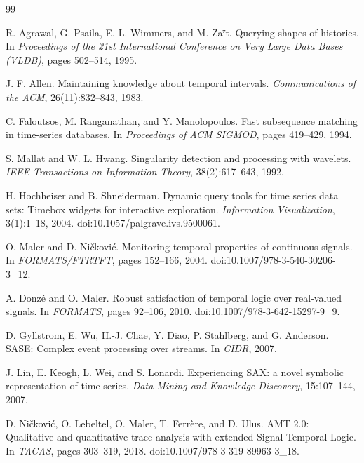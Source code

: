 \documentclass[11pt,a4paper]{article}
\begin{document}
\begin{thebibliography}{99}

R. Agrawal, G. Psaila, E. L. Wimmers, and M. Za\"it.
\newblock Querying shapes of histories.
\newblock In \emph{Proceedings of the 21st International Conference on Very Large Data Bases (VLDB)}, pages 502--514, 1995.

J. F. Allen.
\newblock Maintaining knowledge about temporal intervals.
\newblock \emph{Communications of the ACM}, 26(11):832--843, 1983.

C. Faloutsos, M. Ranganathan, and Y. Manolopoulos.
\newblock Fast subsequence matching in time-series databases.
\newblock In \emph{Proceedings of ACM SIGMOD}, pages 419--429, 1994.

S. Mallat and W. L. Hwang.
\newblock Singularity detection and processing with wavelets.
\newblock \emph{IEEE Transactions on Information Theory}, 38(2):617--643, 1992.

H. Hochheiser and B. Shneiderman.
\newblock Dynamic query tools for time series data sets: Timebox widgets for interactive exploration.
\newblock \emph{Information Visualization}, 3(1):1--18, 2004. doi:10.1057/palgrave.ivs.9500061.

O. Maler and D. Ni\v{c}kovi\'c.
\newblock Monitoring temporal properties of continuous signals.
\newblock In \emph{FORMATS/FTRTFT}, pages 152--166, 2004. doi:10.1007/978-3-540-30206-3\_12.

A. Donz\'e and O. Maler.
\newblock Robust satisfaction of temporal logic over real-valued signals.
\newblock In \emph{FORMATS}, pages 92--106, 2010. doi:10.1007/978-3-642-15297-9\_9.

D. Gyllstrom, E. Wu, H.-J. Chae, Y. Diao, P. Stahlberg, and G. Anderson.
\newblock SASE: Complex event processing over streams.
\newblock In \emph{CIDR}, 2007.

J. Lin, E. Keogh, L. Wei, and S. Lonardi.
\newblock Experiencing SAX: a novel symbolic representation of time series.
\newblock \emph{Data Mining and Knowledge Discovery}, 15:107--144, 2007.

D. Ni\v{c}kovi\'c, O. Lebeltel, O. Maler, T. Ferr\`ere, and D. Ulus.
\newblock AMT 2.0: Qualitative and quantitative trace analysis with extended Signal Temporal Logic.
\newblock In \emph{TACAS}, pages 303--319, 2018. doi:10.1007/978-3-319-89963-3\_18.


\end{thebibliography}
\end{document}
